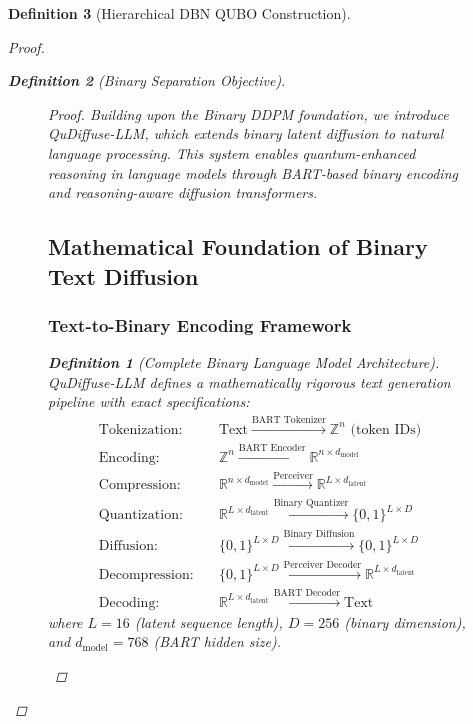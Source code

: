 \documentclass{article}
\newtheorem{definition}{Definition}
\begin{document}
\begin{definition}[Hierarchical DBN QUBO Construction]
\begin{proof}
\begin{definition}[Binary Separation Objective]
\begin{figure}[H]
\begin{proof}
Building upon the Binary DDPM foundation, we introduce QuDiffuse-LLM, which extends binary latent diffusion to natural language processing. This system enables quantum-enhanced reasoning in language models through BART-based binary encoding and reasoning-aware diffusion transformers.

\subsection{Mathematical Foundation of Binary Text Diffusion}

\subsubsection{Text-to-Binary Encoding Framework}

\begin{definition}[Complete Binary Language Model Architecture]
QuDiffuse-LLM defines a mathematically rigorous text generation pipeline with exact specifications:
\begin{align}
\text{Tokenization:} \quad &\text{Text} \xrightarrow{\text{BART Tokenizer}} \mathbb{Z}^n \text{ (token IDs)}\\
\text{Encoding:} \quad &\mathbb{Z}^n \xrightarrow{\text{BART Encoder}} \mathbb{R}^{n \times d_{\text{model}}}\\
\text{Compression:} \quad &\mathbb{R}^{n \times d_{\text{model}}} \xrightarrow{\text{Perceiver}} \mathbb{R}^{L \times d_{\text{latent}}}\\
\text{Quantization:} \quad &\mathbb{R}^{L \times d_{\text{latent}}} \xrightarrow{\text{Binary Quantizer}} \{0,1\}^{L \times D}\\
\text{Diffusion:} \quad &\{0,1\}^{L \times D} \xrightarrow{\text{Binary Diffusion}} \{0,1\}^{L \times D}\\
\text{Decompression:} \quad &\{0,1\}^{L \times D} \xrightarrow{\text{Perceiver Decoder}} \mathbb{R}^{L \times d_{\text{latent}}}\\
\text{Decoding:} \quad &\mathbb{R}^{L \times d_{\text{latent}}} \xrightarrow{\text{BART Decoder}} \text{Text}
\end{align}
where $L=16$ (latent sequence length), $D=256$ (binary dimension), and $d_{\text{model}}=768$ (BART hidden size).
\end{definition}


\end{proof}
\end{figure}
\end{definition}
\end{proof}
\end{definition}
\end{document}
